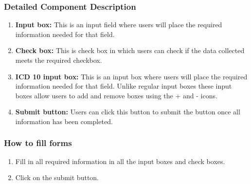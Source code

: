 \documentclass[14pt, a4paper]{article}
\begin{document}
	\subsubsection{Detailed Component Description}
		\begin{enumerate}
			\item \textbf{Input box:} This is an input field where users will place the required information needed for that field.
			\item \textbf{Check box:} This is check box in which users can check if the data collected meets the required checkbox.
			\item \textbf{ICD 10 input box:} This is an input box where users will place the required information needed for that field. Unlike regular input boxes these input boxes allow users to add and remove boxes using the + and - icons.
			\item \textbf{Submit button:} Users can click this button to submit the button once all information has been completed.
		\end{enumerate}
	\subsubsection{How to fill forms}
		\begin{enumerate}
			\item Fill in all required information in all the input boxes and check boxes.
			\item Click on the submit button.
		\end{enumerate}
\end{document}
